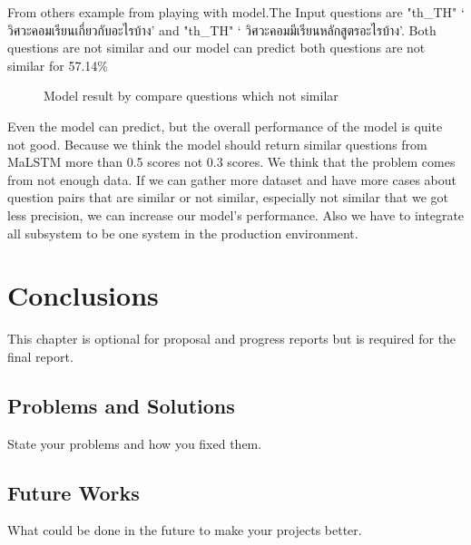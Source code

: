 \documentclass[12pt,oneside,openright,a4paper]{cpe-english-project}
\begin{document}
From others example from playing with model.The Input questions are
{
\XeTeXlinebreaklocale "th_TH"	
\thaifont 
 ‘ วิศวะคอมเรียนเกี่ยวกับอะไรบ้าง’ }and 
{
\XeTeXlinebreaklocale "th_TH"	
\thaifont ‘ วิศวะคอมมีเรียนหลักสูตรอะไรบ้าง’.}
 Both questions are not similar and our model can predict both questions are not similar for 57.14\%

\begin{figure}[!h]\centering
{}
\caption{Model result by compare questions which not similar}\label{fig:Model result by compare questions which not similar}
\end{figure}

Even the model can predict, but the overall performance of the model is quite not good. Because we think the model should return similar questions from MaLSTM more than 0.5 scores not 0.3 scores. We think that the problem comes from not enough data. If we can gather more dataset and have more cases about question pairs that are similar or not similar, especially not similar that we got less precision, we can increase our model's performance. Also we have to integrate all subsystem to be one system in the production environment.

\chapter{Conclusions}

This chapter is optional for proposal and progress reports but 
is required for the final report.

\section{Problems and Solutions}
State your problems and how you fixed them.

\section{Future Works}
What could be done in the future to make your projects better.
\end{document}
